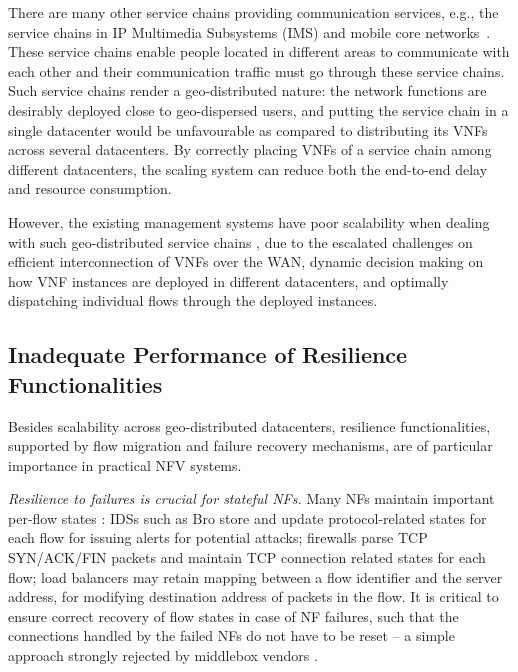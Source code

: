 There are many other service chains providing communication services, e.g., the service chains in IP Multimedia Subsystems (IMS) \cite{3gpp-ims} and mobile core networks~\cite{epc}. These service chains enable people located in different areas to communicate with each other and their communication traffic must go through these service chains. Such service chains render a geo-distributed nature: the network functions are desirably deployed close to geo-dispersed users, and putting the service chain in a single datacenter would be unfavourable as compared to distributing its VNFs across several datacenters. By correctly placing VNFs of a service chain among different datacenters, the scaling system can reduce both the end-to-end delay and resource consumption.

However, the existing management systems have poor scalability when dealing with such geo-distributed service chains \cite{qazi2016klein}, due to the escalated challenges on efficient interconnection of VNFs over the WAN, dynamic decision making on how VNF instances are deployed in different datacenters, and optimally dispatching individual flows through the deployed instances.

\subsection{Inadequate Performance of Resilience Functionalities}

Besides scalability across geo-distributed datacenters, resilience functionalities, supported by flow migration and failure recovery mechanisms, are of particular importance in practical NFV systems.

{\em Resilience to failures \cite{sherry2015rollback,rajagopalan2013pico} is crucial for stateful NFs.}  Many NFs maintain important per-flow states \cite{EnablingNF}: IDSs such as Bro \cite{bro} store and update protocol-related states for each flow for issuing alerts for potential attacks; firewalls \cite{firewall} parse TCP SYN/ACK/FIN packets and maintain TCP connection related states for each flow; load balancers \cite{lvs} may retain mapping between a flow identifier and the server address, for modifying destination address of packets in the flow. It is critical to ensure correct recovery of flow states in case of NF failures, such that the connections handled by the failed NFs do not have to be reset -- a simple approach strongly rejected by middlebox vendors \cite{sherry2015rollback}.

